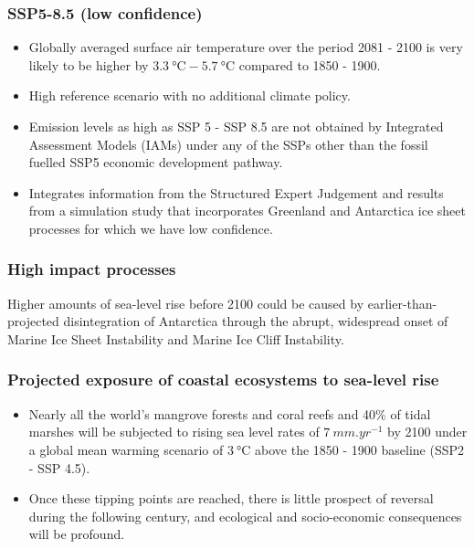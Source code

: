 \documentclass[11pt]{article}
\begin{document}
\subsubsection{SSP5-8.5 (low confidence)}
\label{sec:org3d8d1e4}
\begin{itemize}
\item Globally averaged surface air temperature over the period 2081 - 2100 is very likely to be higher by \(\qty{3.3}{\degreeCelsius} - \qty{5.7}{\degreeCelsius}\) compared to 1850 - 1900.
\item High reference scenario with no additional climate policy.
\item Emission levels as high as SSP 5 - SSP 8.5 are not obtained by Integrated Assessment Models (IAMs) under any of the SSPs other than the fossil fuelled SSP5 economic development pathway.
\item Integrates information from the Structured Expert Judgement and results from a simulation study that incorporates Greenland and Antarctica ice sheet processes for which we have low confidence.
\end{itemize}

\subsubsection{High impact processes}
\label{sec:orgf6023ea}
Higher amounts of sea-level rise before 2100 could be caused by earlier-than-projected disintegration of Antarctica through the abrupt, widespread onset of Marine Ice Sheet Instability and Marine Ice Cliff Instability.

\subsubsection{Projected exposure of coastal ecosystems to sea-level rise}
\label{sec:org628d508}
\begin{itemize}
\item Nearly all the world's mangrove forests and coral reefs and 40\% of tidal marshes will be subjected to rising sea level rates of \(\qty{7}{mm.yr^{-1}}\) by 2100 under a global mean warming scenario of \(\qty{3}{\degreeCelsius}\) above the 1850 - 1900 baseline (SSP2 - SSP 4.5).
\item Once these tipping points are reached, there is little prospect of reversal during the following century, and ecological and socio-economic consequences will be profound.
\end{itemize}
\end{document}
